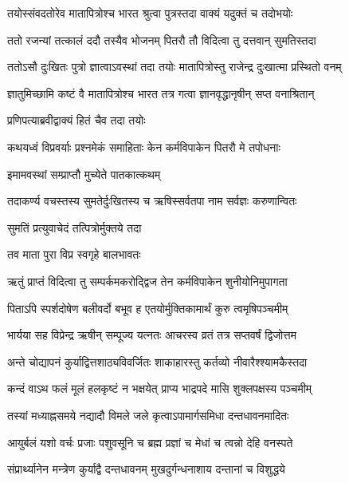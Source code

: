 
\twolineshloka
{तयोस्संवदतोरेव मातापित्रोश्च भारत}
{श्रुत्वा पुत्रस्तदा वाक्यं यदुक्तं च तदोभयोः} %

\twolineshloka
{ततो रजन्यां तत्कालं ददौ तस्यैव भोजनम्}
{पितरौ तौ विदित्वा तु दत्तवान् सुमतिस्तदा} %

\twolineshloka
{ततोऽसौ दुःखितः पुत्रो ज्ञात्वाऽवस्थां तदा तयोः}
{मातापित्रोस्तु राजेन्द्र दुःखात्मा प्रस्थितो वनम्} %

\twolineshloka
{ज्ञातुमिच्छामि कष्टं वै मातापित्रोश्च भारत}
{तत्र गत्वा ज्ञानवृद्धानृषीन् सप्त वनाश्रितान्} %

\onelineshloka
{प्रणिपत्याब्रवीद्वाक्यं हितं चैव तदा तयोः} %


\twolineshloka
{कथयध्वं विप्रवर्याः प्रश्नमेकं समाहिताः}
{केन कर्मविपाकेन पितरौ मे तपोधनाः} %

\onelineshloka
{इमामवस्थां सम्प्राप्तौ मुच्येते पातकात्कथम्} %


\twolineshloka
{तदाकर्ण्य वचस्तस्य सुमतेर्दुःखितस्य च}
{ऋषिस्सर्वतपा नाम सर्वज्ञः करुणान्वितः} %

\onelineshloka
{सुमतिं प्रत्युवाचेदं तत्पित्रोर्मुक्तये तदा} %


\onelineshloka
{तव माता पुरा विप्र स्वगृहे बालभावतः} %

\twolineshloka
{ऋतुं प्राप्तं विदित्वा तु सम्पर्कमकरोद्द्विज}
{तेन कर्मविपाकेन शुनीयोनिमुपागता} %

\twolineshloka
{पिताऽपि स्पर्शदोषेण बलीवर्दो बभूव ह}
{एतयोर्मुक्तिकामार्थं कुरु त्वमृषिपञ्चमीम्} %

\twolineshloka
{भार्यया सह विप्रेन्द्र ऋषीन् सम्पूज्य यत्नतः}
{आचरस्व व्रतं तत्र सप्तवर्षं द्विजोत्तम} %

\twolineshloka
{अन्ते चोद्यापनं कुर्याद्वित्तशाठ्यविवर्जितः}
{शाकाहारस्तु कर्तव्यो नीवारैश्श्यामकैस्तदा} %

\twolineshloka
{कन्दं वाऽथ फलं मूलं हलकृष्टं न भक्षयेत्}
{प्राप्य भाद्रपदे मासि शुक्लपक्षस्य पञ्चमीम्} %

\twolineshloka
{तस्यां मध्याह्नसमये नद्यादौ विमले जले}
{कृत्वाऽपामार्गसमिधा दन्तधावनमादितः} %

\twolineshloka
{आयुर्बलं यशो वर्चः प्रजाः पशुवसूनि च}
{ब्रह्म प्रज्ञां च मेधां च त्वन्नो देहि वनस्पते} %

\twolineshloka
{संप्रार्थ्यानेन मन्त्रेण कुर्याद्वै दन्तधावनम्}
{मुखदुर्गन्धनाशाय दन्तानां च विशुद्धये} %

